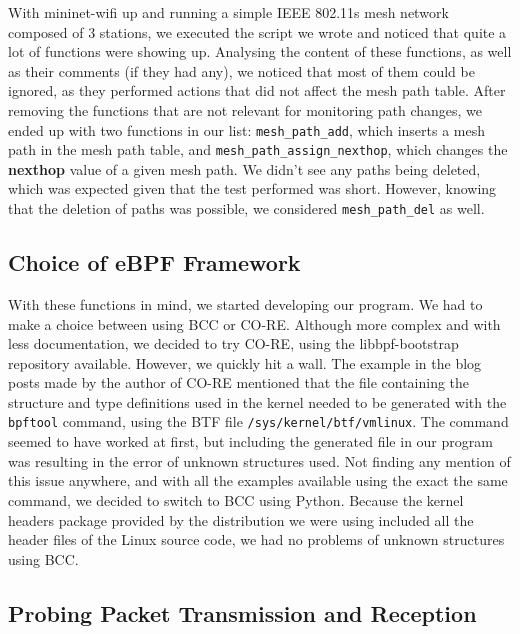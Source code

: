 With mininet-wifi up and running a simple \ac{IEEE} 802.11s mesh network
composed of 3 stations, we executed the script we wrote and noticed that quite a
lot of functions were showing up. Analysing the content of these functions, as
well as their comments (if they had any), we noticed that most of them could be
ignored, as they performed actions that did not affect the mesh path table.
After removing the functions that are not relevant for monitoring path changes,
we ended up with two functions in our list: \texttt{mesh\_path\_add}, which
inserts a mesh path in the mesh path table, and
\texttt{mesh\_path\_assign\_nexthop}, which changes the \textbf{nexthop} value
of a given mesh path. We didn't see any paths being deleted, which was expected
given that the test performed was short. However, knowing that the deletion of
paths was possible, we considered \texttt{mesh\_path\_del} as well.


\subsection{Choice of eBPF Framework}

With these functions in mind, we started developing our program. We had to make
a choice between using \ac{BCC} or \ac{CO-RE}. Although more complex and with
less documentation, we decided to try \ac{CO-RE}, using the libbpf-bootstrap
repository available. However, we quickly hit a wall. The example in the blog
posts made by the author of \ac{CO-RE} mentioned that the file containing the
structure and type definitions used in the kernel needed to be generated with
the \texttt{bpftool} command, using the \ac{BTF} file
\texttt{/sys/kernel/btf/vmlinux}. The command seemed to have worked at first,
but including the generated file in our program was resulting in the error of
unknown structures used. Not finding any mention of this issue anywhere, and
with all the examples available using the exact the same command, we decided to
switch to \ac{BCC} using Python. Because the kernel headers package provided by
the distribution we were using included all the header files of the Linux source
code, we had no problems of unknown structures using \ac{BCC}.


\subsection{Probing Packet Transmission and Reception}\label{subs:pkt}

